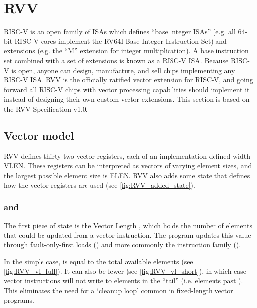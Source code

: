 \section{RVV}\label{chap:bg:sec:rvv}
RISC-V is an open family of ISAs which defines ``base integer ISAs'' (e.g. all 64-bit RISC-V cores implement the RV64I Base Integer Instruction Set) and extensions (e.g. the ``M'' extension for integer multiplication).
A base instruction set combined with a set of extensions is known as a RISC-V ISA.
Because RISC-V is open, anyone can design, manufacture, and sell chips implementing any RISC-V ISA.
RVV is the officially ratified vector extension for RISC-V, and going forward all RISC-V chips with vector processing capabilities should implement it instead of designing their own custom vector extensions.
This section is based on the RVV Specification v1.0.

\subsection{Vector model}
RVV defines thirty-two vector registers, each of an implementation-defined width VLEN.
These registers can be interpreted as vectors of varying element sizes, and the largest possible element size is ELEN.
RVV also adds some state that defines how the vector registers are used (see \cref{fig:RVV_added_state}).


\subsubsection{ and }
The first piece of state is the Vector Length , which holds the number of elements that could be updated from a vector instruction.
The program updates this value through fault-only-first loads () and more commonly the  instruction family ().

In the simple case,  is equal to the total available elements (see \cref{fig:RVV_vl_full}).
It can also be fewer (see \cref{fig:RVV_vl_short}), in which case vector instructions will not write to elements in the \enquote{tail} (i.e. elements past ).
This eliminates the need for a `cleanup loop' common in fixed-length vector programs.


